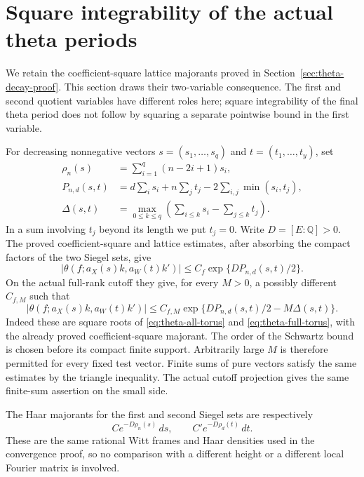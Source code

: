 
\section{Square integrability of the actual theta periods}
\label{sec:sr-theta-period-square-integrability}

We retain the coefficient-square lattice majorants proved in
Section~\ref{sec:theta-decay-proof}. This section draws their two-variable
consequence. The first and second quotient variables have different
roles here; square integrability of the final theta period does not
follow by squaring a separate pointwise bound in the first variable.

For decreasing nonnegative vectors \(s=(s_1,\ldots,s_q)\) and
\(t=(t_1,\ldots,t_y)\), set
\[
 \begin{split}
 \rho_n(s)&=\sum_{i=1}^q(n-2i+1)s_i,\\
 P_{n,d}(s,t)&=
    d\sum_i s_i+n\sum_jt_j
                    -2\sum_{i,j}\min(s_i,t_j),\\
 \Delta(s,t)&=\max_{0\le k\le q}
             \left(\sum_{i\le k}s_i-\sum_{j\le k}t_j\right).
 \end{split}
 \tag{Q1}\label{eq:sr-theta-square-chamber-data}
\]
In a sum involving \(t_j\) beyond its length we put \(t_j=0\).
Write \(D=[E:\mathbb Q]>0\).
The proved coefficient-square and lattice estimates, after absorbing
the compact factors of the two Siegel sets, give
\[
 |\theta(f;a_X(s)k,a_W(t)k')|
       \le C_f\exp\{DP_{n,d}(s,t)/2\}.
 \tag{Q2}\label{eq:sr-theta-square-all-bound}
\]
On the actual full-rank cutoff they give, for every \(M>0\), a possibly
different \(C_{f,M}\) such that
\[
 |\theta(f;a_X(s)k,a_W(t)k')|
   \le C_{f,M}
       \exp\{DP_{n,d}(s,t)/2-M\Delta(s,t)\}.
 \tag{Q3}\label{eq:sr-theta-square-full-bound}
\]
Indeed these are square roots of
\eqref{eq:theta-all-torus} and
\eqref{eq:theta-full-torus}, with the already proved
coefficient-square majorant. The order of the Schwartz bound is
chosen before its compact finite support. Arbitrarily large \(M\)
is therefore permitted for every fixed test vector.
Finite sums of pure vectors satisfy the same estimates by the
triangle inequality. The actual cutoff projection gives the same
finite-sum assertion on the small side.

The Haar majorants for the first and second Siegel sets are respectively
\[
       C e^{-D\rho_n(s)}\,ds,\qquad
       C'e^{-D\rho_d(t)}\,dt.
 \tag{Q4}\label{eq:sr-theta-square-haar}
\]
These are the same rational Witt frames and Haar densities used in
the convergence proof, so no comparison with a different height
or a different local Fourier matrix is involved.

